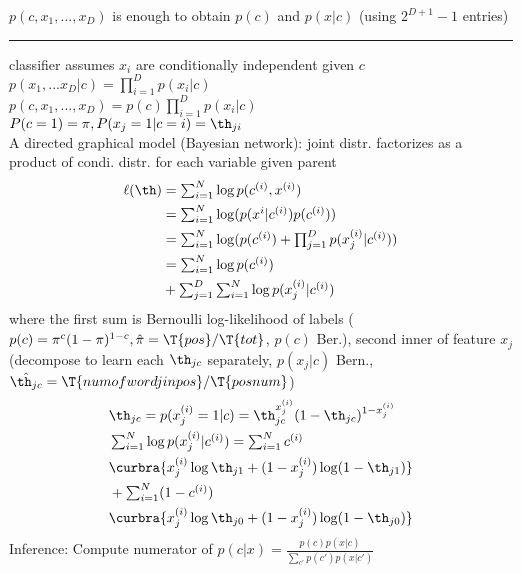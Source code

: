 \documentclass[10pt]{CheatSheet/hw}
\begin{document}
\begin{multicols*}{5}
$p(c,x_1,...,x_D)$ is enough to obtain $p(c)$ and $p(x|c)$ (using $2^{D+1}-1$ entries)
\rule{\linewidth}{0.4pt}
 classifier assumes $x_i$ are conditionally independent given $c$\\
$p(x_1,...x_D|c)=\prod_{i=1}^D p(x_i|c)$\\
$p(c,x_1,...,x_D)=p(c)\prod_{i=1}^D p(x_i|c)$\\
$P(c=1)=\pi, P(x_j=1|c=i)=\th_{ji}$\\
A directed graphical model (Bayesian network): joint distr. factorizes as a product of condi. distr. for each variable given parent
\begin{align*}
    \ell(\th) &=\textstyle\sum_{i=1}^N \log p(c^{(i)},x^{(i)})\\
    &=\textstyle\sum_{i=1}^N \log (p(x^{i}|c^{(i)})p(c^{(i)}))\\
    &=\textstyle\sum_{i=1}^N \log (p(c^{(i)})+\textstyle\prod_{j=1}^D p(x_j^{(i)}|c^{(i)}))\\
    &=\textstyle\sum_{i=1}^N \log p(c^{(i)}) \\
    &+\textstyle\sum_{j=1}^D \textstyle\sum_{i=1}^N \log p(x_j^{(i)}|c^{(i)})
\end{align*}
where the first sum is Bernoulli log-likelihood of labels ($p(c)=\pi^c(1-\pi)^{1-c}, \hat{\pi}=\T{pos}/\T{tot}$, $p(c)$ Ber.), second inner of feature $x_j$ (decompose to learn each $\th_{jc}$ separately, $p(x_j|c)$ Bern., $\hat{\th_{jc}}=\T{num of word j in pos}/\T{pos num}$)
\begin{align*}
    &\th_{jc}=p(x_j^{(i)}=1|c)=\th_{jc}^{x_j^{(i)}}(1-\th_{jc})^{1-x_j^{(i)}}\\
    &\textstyle\sum_{i=1}^N \log p(x_j^{(i)}|c^{(i)})=\textstyle\sum_{i=1}^N c^{(i)}\\
    &\curbra{x_j^{(i)}\log\th_{j1}+(1-x_j^{(i)})\log(1-\th_{j1})}\\
    &+\textstyle\sum_{i=1}^N(1-c^{(i)})\\
    &\curbra{x_j^{(i)}\log\th_{j0}+(1-x_j^{(i)})\log(1-\th_{j0})}
\end{align*}
Inference: Compute numerator of $p(c|x)=\frac{p(c)p(x|c)}{\sum_{c'}p(c')p(x|c')}$


\end{multicols*}
\end{document}
